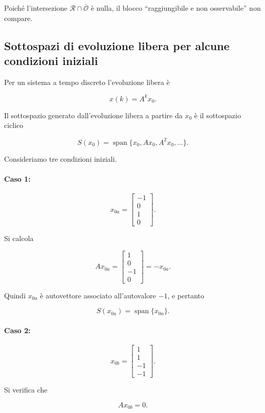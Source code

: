 Poiché l'intersezione \(\mathcal R\cap\bar{\mathcal O}\) è nulla, il blocco ``raggiungibile e non osservabile'' non compare.

\bigskip

\subsection{Sottospazi di evoluzione libera per alcune condizioni iniziali}

Per un sistema a tempo discreto l'evoluzione libera è

\[
x(k)=A^k x_0.
\]

Il sottospazio generato dall'evoluzione libera a partire da \(x_0\) è il sottospazio ciclico

\[
S(x_0)=\operatorname{span}\{x_0,Ax_0,A^2x_0,\dots\}.
\]

Consideriamo tre condizioni iniziali.

\paragraph{Caso 1:}
\[
x_{0a}=
\begin{bmatrix}
-1\\0\\1\\0
\end{bmatrix}.
\]

Si calcola

\[
Ax_{0a}=
\begin{bmatrix}
1\\0\\-1\\0
\end{bmatrix}
=
-x_{0a}.
\]

Quindi \(x_{0a}\) è autovettore associato all'autovalore \(-1\), e pertanto

\[
S(x_{0a})=\operatorname{span}\{x_{0a}\}.
\]

\paragraph{Caso 2:}
\[
x_{0b}=
\begin{bmatrix}
1\\1\\-1\\-1
\end{bmatrix}.
\]

Si verifica che

\[
Ax_{0b}=0.
\]

